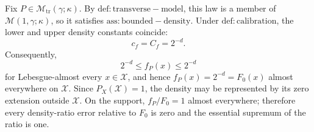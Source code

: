 Fix \(P\in\mathcal M_{\mathrm{tr}}(\gamma;\kappa)\). By \(\mathrm{def:transverse-model}\), this law is a member of \(\mathcal M(1,\gamma;\kappa)\), so it satisfies \(\mathrm{ass:bounded-density}\). Under \(\mathrm{def:calibration}\), the lower and upper density constants coincide:
\[
c_f=C_f=2^{-d}.
\]
Consequently,
\[
2^{-d}\le f_P(x)\le2^{-d}
\]
for Lebesgue-almost every \(x\in\mathcal X\), and hence \(f_P(x)=2^{-d}=F_0(x)\) almost everywhere on \(\mathcal X\). Since \(P_X(\mathcal X)=1\), the density may be represented by its zero extension outside \(\mathcal X\). On the support, \(f_P/F_0=1\) almost everywhere; therefore every density-ratio error relative to \(F_0\) is zero and the essential supremum of the ratio is one.